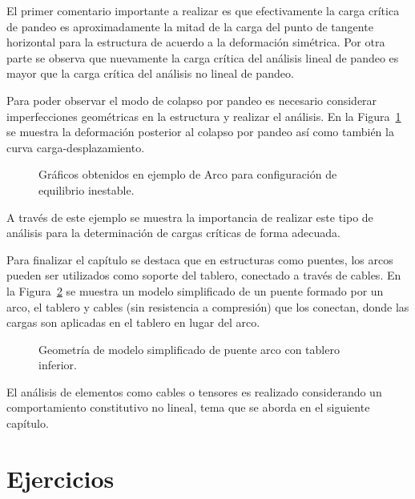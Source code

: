 El primer comentario importante a realizar es que efectivamente la carga crítica de pandeo es aproximadamente la mitad de la carga del punto de tangente horizontal para la estructura de acuerdo a la deformación simétrica. %
%
Por otra parte se observa que nuevamente la carga crítica del análisis lineal de pandeo es mayor que la carga crítica del análisis no lineal de pandeo.

Para poder observar el modo de colapso por pandeo es necesario considerar imperfecciones geométricas en la estructura y realizar el análisis. %
%
En la Figura~\ref{fig:arcopand} se muestra la deformación posterior al colapso por pandeo así como también la curva carga-desplazamiento.

\begin{figure}[htb]
	\centering
	\resizebox{.47\linewidth}{!}{}
	\resizebox{.47\linewidth}{!}{}
	\caption{Gráficos obtenidos en ejemplo de Arco para configuración de equilibrio inestable.}
	\label{fig:arcopand}
\end{figure}

A través de este ejemplo se muestra la importancia de realizar este tipo de análisis para la determinación de cargas críticas de forma adecuada.

Para finalizar el capítulo se destaca que en estructuras como puentes, los arcos pueden ser utilizados como soporte del tablero, conectado a través de cables. %
%
En la Figura~\ref{fig:arcobridge} se muestra un modelo simplificado de un puente formado por un arco, el tablero y cables (sin resistencia a compresión) que los conectan, donde las cargas son aplicadas en el tablero en lugar del arco. %
%
\begin{figure}[htb]
	\centering
	\resizebox{.55\linewidth}{!}{}
	\caption{Geometría de modelo simplificado de puente arco con tablero inferior.}
	\label{fig:arcobridge}
\end{figure}
%

El análisis de elementos como cables o tensores es realizado considerando un comportamiento constitutivo no lineal, tema que se aborda en el siguiente capítulo.





\section{Ejercicios}




